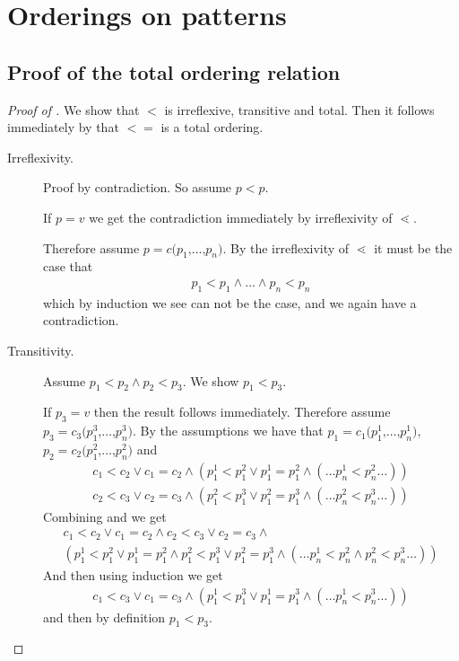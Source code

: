 \section{Orderings on patterns}

\subsection{Proof of the total ordering relation}
\label{sec:proof-total-orderings}


\begin{proof}[Proof of {}]
  We show that $<$ is irreflexive, transitive and total. Then it follows
  immediately by  that $<=$ is a total ordering.
  \begin{description}
  \item[Irreflexivity.]
    Proof by contradiction. So assume $p < p$.

    If $p = v$ we get the contradiction immediately by irreflexivity of
    $\lessdot$.

    Therefore assume $p = c \texttt{(} p_1 \texttt{,} \ldots \texttt{,} p_n
    \texttt{)}$. By the irreflexivity of $\lessdot$ it must be the case that
    \begin{eqnarray*}
      p_1 < p_1 \land \ldots \land p_n < p_n
    \end{eqnarray*}
    which by induction we see can not be the case, and we again have a
    contradiction.

  \item[Transitivity.]
    Assume $p_1 < p_2 \land p_2 < p_3$. We show $p_1 < p_3$.

    If $p_3 = v$ then the result follows immediately. Therefore assume $p_3 = c_3
    \texttt{(}p^3_1 \texttt{,} \ldots \texttt{,} p^3_n\texttt{)}$.
    By the assumptions we have that $p_1 = c_1 \texttt{(}p^1_1 \texttt{,} \ldots
    \texttt{,} p^1_n\texttt{)}$, $p_2 = c_2 \texttt{(}p^2_1 \texttt{,} \ldots
    \texttt{,} p^2_n\texttt{)}$ and
    \begin{eqnarray}[c]
      c_1 < c_2 \lor c_1 = c_2 \land ( p^1_1 < p^2_1 \lor p^1_1 = p^2_1 \land
      (\ldots p^1_n < p^2_n \ldots )) \label{eq:trans-tot-proof-1}\\
      c_2 < c_3 \lor c_2 = c_3 \land ( p^2_1 < p^3_1 \lor p^2_1 = p^3_1 \land
      (\ldots p^2_n < p^3_n \ldots )) \label{eq:trans-tot-proof-2}
    \end{eqnarray}
    Combining  and  we get
    \begin{eqnarray*}[c]
      c_1 < c_2 \lor c_1 = c_2 \land c_2 < c_3 \lor c_2 = c_3 \land\\ ( p^1_1 < p^2_1
      \lor p^1_1 = p^2_1 \land p^2_1 < p^3_1 \lor p^2_1 = p^3_1 \land
      (\ldots p^1_n < p^2_n \land p^2_n < p^3_n \ldots ))
    \end{eqnarray*}
    And then using induction we get
    \begin{eqnarray*}
      c_1 < c_3 \lor c_1 = c_3 \land ( p^1_1 < p^3_1 \lor p^1_1 = p^3_1 \land
      (\ldots p^1_n < p^3_n \ldots ))
    \end{eqnarray*}
    and then by definition $p_1 < p_3$.


\end{description}
\end{proof}
